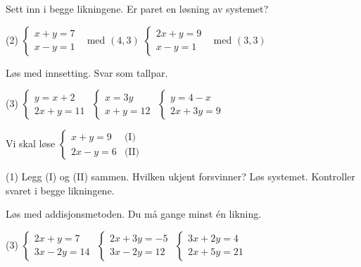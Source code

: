 
Sett inn i begge likningene. Er paret en løsning av systemet?
\begin{tasks}(2)
  \task $\begin{cases} x + y = 7\\ x - y = 1 \end{cases}$ \ med $(4, 3)$
  \task $\begin{cases} 2x + y = 9\\ x - y = 1 \end{cases}$ \ med $(3, 3)$
\end{tasks}

Løs med innsetting. Svar som tallpar.
\begin{tasks}(3)
  \task $\begin{cases} y = x + 2\\ 2x + y = 11 \end{cases}$
  \task $\begin{cases} x = 3y\\ x + y = 12 \end{cases}$
  \task $\begin{cases} y = 4 - x\\ 2x + 3y = 9 \end{cases}$
\end{tasks}

Vi skal løse $\begin{cases} x + y = 9 & \text{(I)}\\ 2x - y = 6 & \text{(II)} \end{cases}$
\begin{tasks}(1)
  \task Legg (I) og (II) sammen. Hvilken ukjent forsvinner?
  \task Løs systemet.
  \task Kontroller svaret i begge likningene.
\end{tasks}


Løs med addisjonsmetoden. Du må gange minst én likning.
\begin{tasks}(3)
  \task $\begin{cases} 2x + y = 7\\ 3x - 2y = 14 \end{cases}$
  \task $\begin{cases} 2x + 3y = -5\\ 3x - 2y = 12 \end{cases}$
  \task $\begin{cases} 3x + 2y = 4\\ 2x + 5y = 21 \end{cases}$
\end{tasks}

